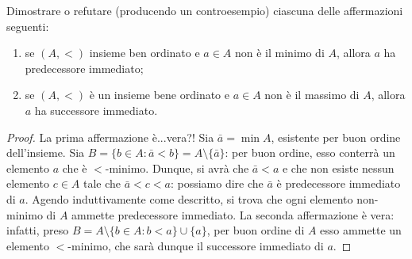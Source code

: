 \begin{exe}
  Dimostrare o refutare (producendo un controesempio) ciascuna delle affermazioni seguenti:
  \begin{enumerate}
    \item se \((A,<)\) insieme ben ordinato e \(a \in A\) non è il minimo di \(A\), allora \(a\) ha predecessore immediato;
    \item se \((A,<)\) è un insieme bene ordinato e \(a \in A\) non è il massimo di \(A\), allora \(a\) ha successore immediato.
  \end{enumerate}
\end{exe}
\begin{proof}
  La prima affermazione è...vera?! Sia \(\bar{a} = \min A\), esistente per buon ordine dell'insieme. Sia \(B = \lbrace b \in A \colon \bar{a} < b \rbrace = A \setminus \lbrace \bar{a} \rbrace\): per buon ordine, esso conterrà un elemento \(a\) che è \(<\)-minimo. Dunque, si avrà che \(\bar{a} < a\) e che non esiste nessun elemento \(c \in A\) tale che \(\bar{a} < c < a\): possiamo dire che \(\bar{a}\) è predecessore immediato di \(a\). Agendo induttivamente come descritto, si trova che ogni elemento non-minimo di \(A\) ammette predecessore immediato.
  La seconda affermazione è vera: infatti, preso \(B = A \setminus \lbrace b \in A \colon b < a\rbrace \cup \lbrace a \rbrace\), per buon ordine di \(A\) esso ammette un elemento \(<\)-minimo, che sarà dunque il successore immediato di \(a\).
\end{proof}

